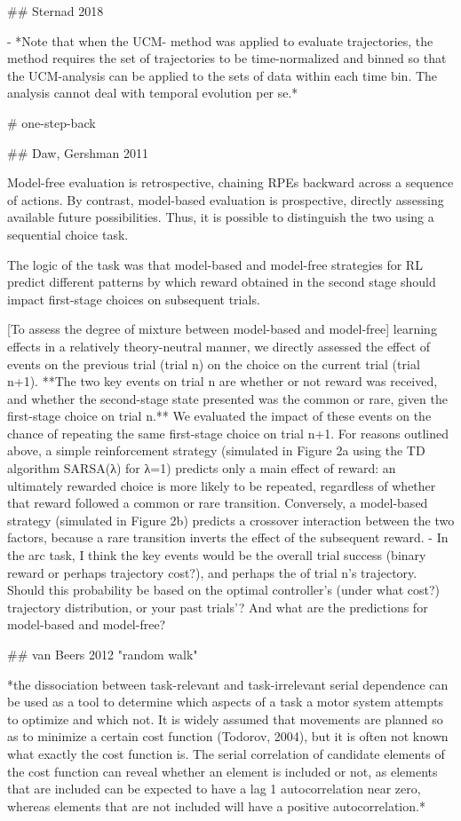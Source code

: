 \documentclass[../main.tex]{subfiles}
\begin{document}
{{## Sternad 2018

- *Note that when the UCM- method was applied to evaluate trajectories, the method requires the set of trajectories to be time-normalized and binned so that the UCM-analysis can be applied to the sets of data within each time bin. The analysis cannot deal with temporal evolution per se.*


# one-step-back

## Daw, Gershman 2011

Model-free evaluation is retrospective, chaining RPEs backward across a sequence of actions. By contrast, model-based evaluation is prospective, directly assessing available future possibilities. Thus, it is possible to distinguish the two using a sequential choice task.

The logic of the task was that model-based and model-free strategies for RL predict different patterns by which reward obtained in the second stage should impact first-stage choices on subsequent trials.

[To assess the degree of mixture between model-based and model-free] learning effects in a relatively theory-neutral manner, we directly assessed the effect of events on the previous trial (trial n) on the choice on the current trial (trial n+1). **The two key events on trial n are whether or not reward was received, and whether the second-stage state presented was the common or rare, given the first-stage choice on trial n.** We evaluated the impact of these events on the chance of repeating the same first-stage choice on trial n+1. For reasons outlined above, a simple reinforcement strategy (simulated in Figure 2a using the TD algorithm SARSA(λ) for λ=1) predicts only a main effect of reward: an ultimately rewarded choice is more likely to be repeated, regardless of whether that reward followed a common or rare transition. Conversely, a model-based strategy (simulated in Figure 2b) predicts a crossover interaction between the two factors, because a rare transition inverts the effect of the subsequent reward.
- In the arc task, I think the key events would be the overall trial success (binary reward or perhaps trajectory cost?), and perhaps the of trial n's trajectory. Should this probability be based on the optimal controller's (under what cost?) trajectory distribution, or your past trials'? And what are the predictions for model-based and model-free?


## van Beers 2012 "random walk"

*the dissociation between task-relevant and task-irrelevant serial dependence can be used as a tool to determine which aspects of a task a motor system attempts to optimize and which not. It is widely assumed that movements are planned so as to minimize a certain cost function (Todorov, 2004), but it is often not known what exactly the cost function is. The serial correlation of candidate elements of the cost function can reveal whether an element is included or not, as elements that are included can be expected to have a lag 1 autocorrelation near zero, whereas elements that are not included will have a positive autocorrelation.*


}}
\end{document}
